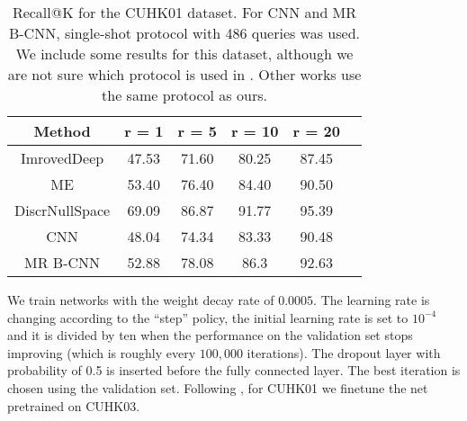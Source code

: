 


\begin{table}%
\begin{center}
\caption{Recall@K for the CUHK01 dataset. For CNN and MR B-CNN,  single-shot protocol with 486 queries was used. We include some results for this dataset, although we are not sure which protocol is used in \citep{zhang2016learning}. Other works use the same protocol as ours.}
\begin{tabular}{c|ccccc}
\hline
Method                & r = 1   &  r = 5   & r = 10   & r = 20 \\
\hline
ImrovedDeep \citep{ahmed2015improved} &47.53& 71.60& 80.25& 87.45\\
ME \citep{paisitkriangkrai2015learning} & 53.40 & 76.40 & 84.40 & 90.50\\
DiscrNullSpace \citep{zhang2016learning} & 69.09 &86.87 &91.77& 95.39\\
 \hline
CNN     & 48.04 &74.34 &83.33& 90.48 \\
MR B-CNN & 52.88 &78.08& 86.3& 92.63 \\
 \hline
\end{tabular}
\label{tab:cuhk01}
\end{center}
\end{table} 


We train networks with the weight decay rate of $0.0005$. The learning rate is changing according to the ``step'' policy, the initial learning rate is set to $10^{-4}$ and it is divided by ten when the performance on the validation set stops improving (which is roughly every $100,000$ iterations). 
The dropout layer with probability of 0.5 is inserted before the fully connected layer. The best iteration is chosen using the validation set. Following \citep{ahmed2015improved}, for CUHK01 we finetune the net pretrained on CUHK03. 


